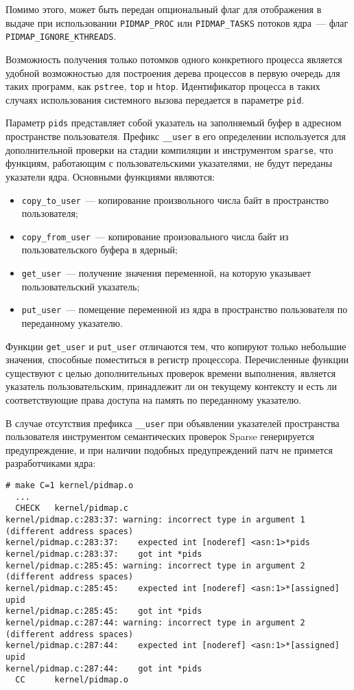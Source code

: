 Помимо этого, может быть передан опциональный флаг для отображения в выдаче
при использовании \texttt{PIDMAP\_PROC} или \texttt{PIDMAP\_TASKS} потоков
ядра~--- флаг \texttt{PIDMAP\_IGNORE\_KTHREADS}.

Возможность получения только потомков одного конкретного процесса является
удобной возможностью для построения дерева процессов в первую очередь для таких
программ, как \texttt{pstree}, \texttt{top} и \texttt{htop}. Идентификатор
процесса в таких случаях использования системного вызова передается в параметре
\texttt{pid}.

Параметр \texttt{pids} представляет собой указатель на заполняемый буфер в
адресном пространстве пользователя. Префикс \texttt{\_\_user} в его определении
используется для дополнительной проверки на стадии компиляции и инструментом
\texttt{sparse}, что функциям, работающим с пользовательскими указателями, не
будут переданы указатели ядра. Основными функциями  являются:
\begin{itemize}
\item \texttt{copy\_to\_user}~--- копирование произвольного числа байт в
  пространство пользователя;
\item \texttt{copy\_from\_user}~--- копирование произовального числа байт из
  пользовательского буфера в ядерный;
\item \texttt{get\_user}~--- получение значения переменной, на которую указывает
  пользовательский указатель;
\item \texttt{put\_user}~--- помещение переменной из ядра в пространство
  пользователя по переданному указателю.
\end{itemize}

Функции \texttt{get\_user} и \texttt{put\_user} отличаются тем, что копируют
только небольшие значения, способные поместиться в регистр процессора.
Перечисленные функции существуют с целью дополнительных проверок времени
выполнения, является указатель пользовательским, принадлежит ли он текущему
контексту и есть ли соответствующие права доступа на память по переданному
указателю.

В случае отсутствия префикса \texttt{\_\_user} при объявлении указателей
пространства пользователя инструментом семантических проверок Sparse
генерируется предупреждение, и при наличии подобных предупреждений патч не
примется разработчиками ядра:

\medskip
\begin{lstlisting}[style=cstyle]
# make C=1 kernel/pidmap.o
  ...
  CHECK   kernel/pidmap.c
kernel/pidmap.c:283:37: warning: incorrect type in argument 1 (different address spaces)
kernel/pidmap.c:283:37:    expected int [noderef] <asn:1>*pids
kernel/pidmap.c:283:37:    got int *pids
kernel/pidmap.c:285:45: warning: incorrect type in argument 2 (different address spaces)
kernel/pidmap.c:285:45:    expected int [noderef] <asn:1>*[assigned] upid
kernel/pidmap.c:285:45:    got int *pids
kernel/pidmap.c:287:44: warning: incorrect type in argument 2 (different address spaces)
kernel/pidmap.c:287:44:    expected int [noderef] <asn:1>*[assigned] upid
kernel/pidmap.c:287:44:    got int *pids
  CC      kernel/pidmap.o
\end{lstlisting}
\medskip

